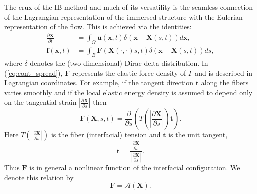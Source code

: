 \documentclass[preprint,12pt]{elsarticle}
\begin{document}
The crux of the IB method and much of its versatility is the seamless connection of the Lagrangian representation of the immersed structure with the Eulerian representation of the flow. This is achieved via the identities:
\begin{align}
\frac{\partial \mathbf{X}}{\partial t}  &= \int_{\Omega} \mathbf{u}(\mathbf{x},t)\delta(\mathbf{x}-\mathbf{X}(s,t)) d \mathbf{x}, \label{eq:cont_interp} \\
\mathbf{f}(\mathbf{x},t) &= \int_{B} \mathbf{F}(\mathbf{X}(\cdot,\cdot)s,t)\delta(\mathbf{x}-\mathbf{X}(s,t)) ds
\label{eq:cont_spread},
\end{align}
where $\delta$ denotes the (two-dimensional) Dirac delta distribution. In (\ref{eq:cont_spread}), $\mathbf{F}$
represents the elastic force density of $\Gamma$ and is described in Lagrangian coordinates.  For example, 
if the tangent direction $\mathbf{t}$ along the fibers varies smoothly and if the local elastic energy density is assumed to depend only on the tangential strain $|\frac{\partial\mathbf{X}}{\partial s}|$ then
\begin{equation}
\mathbf{F}(\mathbf{X},s,t) = \frac{ \partial }{\partial s} \left(T\left(\left|\frac{\partial\mathbf{X}}{\partial s}\right|\right) \mathbf{t}\right).
\end{equation}
Here $T(|\frac{\partial\mathbf{X}}{\partial s}|)$ is the fiber (interfacial) tension and $\mathbf{t}$ is the unit tangent,
\begin{equation}
\mathbf{t} =\frac{\frac{\partial\mathbf{X}}{\partial s}}{|\frac{\partial\mathbf{X}}{\partial s}|}.
\end{equation}
Thus $\mathbf{F}$ is in general a nonlinear function of the interfacial configuration. We denote this relation by
\begin{equation}
\mathbf{F} = \mathcal{A}(\mathbf{X}).
\end{equation}
\end{document}
